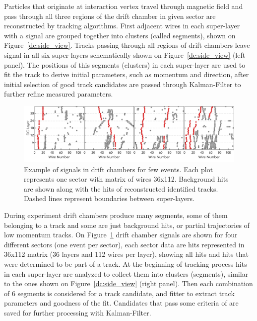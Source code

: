 Particles that originate at interaction vertex travel through magnetic field and pass through all three regions of the drift chamber in given sector are reconstructed by tracking algorithms. First adjacent  wires in each super-layer with a signal are grouped together into clusters (called segments), shown on Figure~\ref{dc:side_view}. Tracks passing through all regions of drift chambers leave signal in all six super-layers schematically shown on Figure~\ref{dc:side_view} (left panel).  The positions of this segments (clusters) in each super-layer are used to fit the track to derive initial parameters, such as momentum and direction, after initial selection of good track candidates are passed through Kalman-Filter to further refine measured parameters.

\begin{figure}[!ht]
\begin{center}
 \includegraphics[width=6.2in]{images/figure_dc_examples.pdf}
\caption {Example of signals in drift chambers for few events. Each plot represents one sector with matrix of wires 36x112. Background hits are shown along with the hits of reconstructed identified tracks. Dashed lines represent boundaries between super-layers.}
 \label{dc:events_sector}
 \end{center}
\end{figure}

During experiment drift chambers produce many segments, some of them belonging to a track and some are just background hits, or partial trajectories of low momentum tracks. On Figure~\ref{dc:events_sector} drift chamber signals are shown for four different sectors (one event per sector), each sector data are hits represented in 36x112 matrix (36 layers and 112 wires per layer), showing all hits and hits that were determined to be part of a track. At the beginning of tracking process hits in each super-layer are analyzed to collect them into clusters (segments), similar to the ones shown on Figure~\ref{dc:side_view} (right panel). Then each combination of 6 segments is considered for a track candidate, and fitter to extract track parameters and goodness of the fit. Candidates that pass some criteria of are saved for further processing with Kalman-Filter. 

